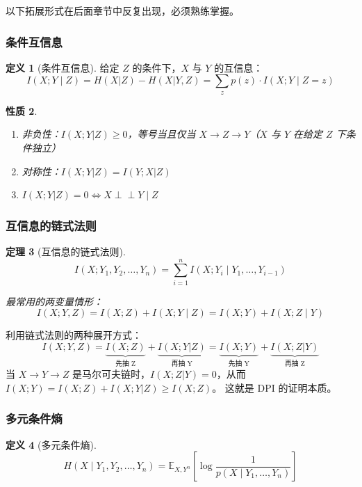\documentclass[12pt,a4paper]{ctexart}
\newtheorem{theorem}{定理}[section]
\newtheorem{property}[theorem]{性质}
\theoremstyle{definition}
\newtheorem{definition}[theorem]{定义}
\newcommand{\indep}{\perp\!\!\!\perp}
\begin{document}
以下拓展形式在后面章节中反复出现，必须熟练掌握。

\subsubsection{条件互信息}

\begin{definition}[条件互信息]
给定 $Z$ 的条件下，$X$ 与 $Y$ 的互信息：
\[
I(X;Y \mid Z) = H(X|Z) - H(X|Y,Z)
= \sum_{z} p(z) \cdot I(X;Y \mid Z=z)
\]
\end{definition}

\begin{property}
\begin{enumerate}[label=(\arabic*),nosep]
  \item 非负性：$I(X;Y|Z) \geq 0$，等号当且仅当 $X \to Z \to Y$（$X$ 与 $Y$ 在给定 $Z$ 下条件独立）
  \item 对称性：$I(X;Y|Z) = I(Y;X|Z)$
  \item $I(X;Y|Z) = 0 \iff X \indep Y \mid Z$
\end{enumerate}
\end{property}

\subsubsection{互信息的链式法则}

\begin{theorem}[互信息的链式法则]
\[
I(X; Y_1, Y_2, \ldots, Y_n) = \sum_{i=1}^{n} I(X; Y_i \mid Y_1, \ldots, Y_{i-1})
\]

最常用的两变量情形：
\[
I(X; Y, Z) = I(X; Z) + I(X; Y \mid Z) = I(X; Y) + I(X; Z \mid Y)
\]
\end{theorem}

\begin{proofbox}
利用链式法则的两种展开方式：
\[
I(X; Y, Z) = \underbrace{I(X; Z)}_{\text{先抽 Z}} + \underbrace{I(X; Y|Z)}_{\text{再抽 Y}}
           = \underbrace{I(X; Y)}_{\text{先抽 Y}} + \underbrace{I(X; Z|Y)}_{\text{再抽 Z}}
\]
当 $X \to Y \to Z$ 是马尔可夫链时，$I(X; Z|Y) = 0$，从而 $I(X;Y) = I(X;Z) + I(X;Y|Z) \geq I(X;Z)$。
这就是 DPI 的证明本质。
\end{proofbox}

\subsubsection{多元条件熵}

\begin{definition}[多元条件熵]
\[
H(X \mid Y_1, Y_2, \ldots, Y_n) = \mathbb{E}_{X,Y^n}\!\left[\log\frac{1}{p(X \mid Y_1,\ldots,Y_n)}\right]
\]
\end{definition}
\end{document}
